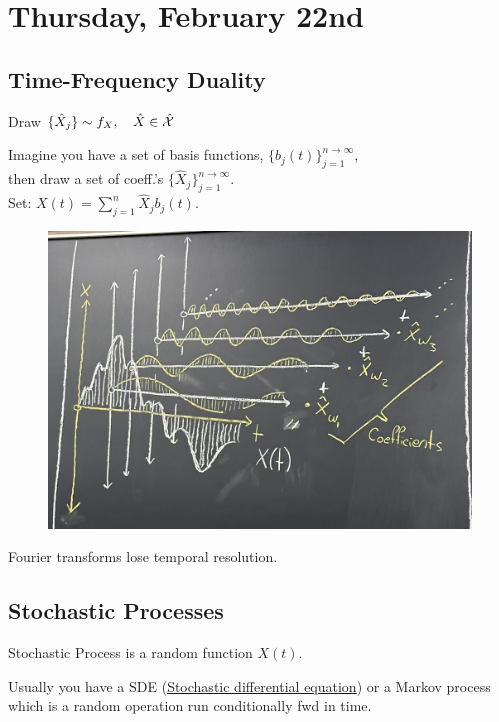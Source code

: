 \section{Thursday, February 22nd}
\subsection{Time-Frequency Duality}
Draw $\{\hat{X}_j\}\sim f_X,\quad\hat{X}\in\hat{\mathcal{X}}$
\begin{shaded}
Imagine you have a set of basis functions, $\{b_j(t)\}_{j=1}^{n\to\infty}$, \\
then draw a set of coeff.'s $\{\hat{X}_j\}_{j=1}^{n\to\infty}$.\\
Set: $X(t)=\sum_{j=1}^{n}\hat{X}_j b_j(t)$.
\end{shaded}
\begin{figure}[H]
    \centering
    \includegraphics[scale=0.13]{lectures/wk6/img/time-freq.jpeg}
\end{figure}

\begin{important}
Fourier transforms lose temporal resolution.
\end{important}

\subsection{Stochastic Processes}
\begin{defn}{Stochastic Process}
is a random function $X(t)$.
\end{defn}

Usually you have a SDE (\href{https://en.wikipedia.org/wiki/Stochastic_differential_equation}{Stochastic differential equation}) or a Markov process which is a random operation run conditionally fwd in time.

